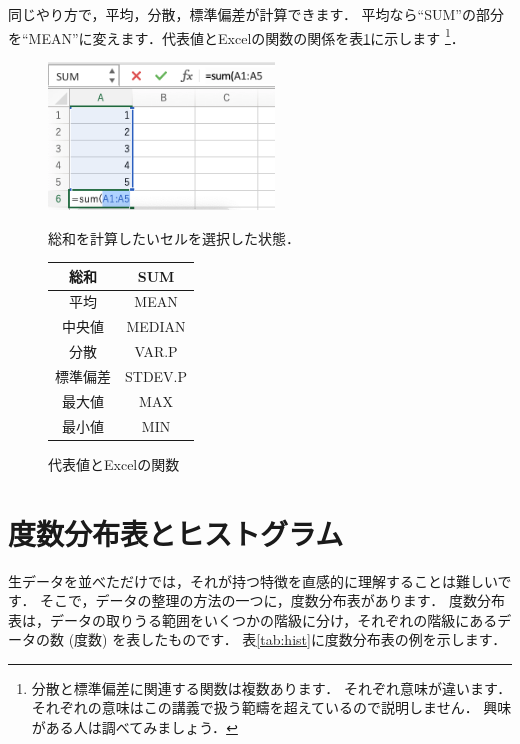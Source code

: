 同じやり方で，平均，分散，標準偏差が計算できます．
平均なら``SUM''の部分を``MEAN''に変えます．代表値とExcelの関数の関係を表\ref{tab:funcs}に示します
\footnote{分散と標準偏差に関連する関数は複数あります．
  それぞれ意味が違います．
  それぞれの意味はこの講義で扱う範疇を超えているので説明しません．
  興味がある人は調べてみましょう．}．

\begin{figure}[htbp]
    \begin{minipage}{0.5\hsize}
        \centering
        \includegraphics[width=6cm]{chap1/sum.png}
        \caption{総和を計算したいセルを選択した状態．}
        \label{fig:sum}
    \end{minipage}
    \begin{minipage}{0.5\hsize}
        \centering
        \makeatletter
        \def\@captype{table}
        \makeatother
        \caption{代表値とExcelの関数}
        \begin{tabular}{|c|c|}
          \hline
          総和     & SUM\\ \hline
          平均     & MEAN\\ \hline
          中央値   & MEDIAN \\ \hline
          分散     & VAR.P\\ \hline
          標準偏差 & STDEV.P \\ \hline
          最大値   & MAX \\ \hline
          最小値   & MIN \\ \hline
        \end{tabular}
        \label{tab:funcs}
    \end{minipage}
\end{figure}

\section{度数分布表とヒストグラム}

生データを並べただけでは，それが持つ特徴を直感的に理解することは難しいです．
そこで，データの整理の方法の一つに，度数分布表があります．
度数分布表は，データの取りうる範囲をいくつかの階級に分け，それぞれの階級にあるデータの数 (度数) を表したものです．
表\ref{tab:hist}に度数分布表の例を示します．

